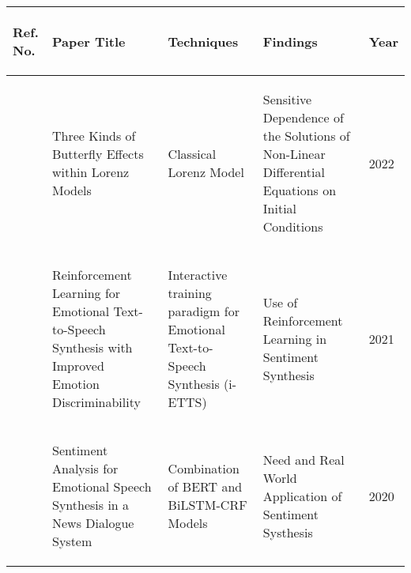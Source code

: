 \begin{tabularx}{\columnwidth}{|X|X|X|X|X|}
	\hline
	\begin{center}\textbf{Ref. No.}\end{center} & \begin{center}\textbf{Paper Title}\end{center} & \begin{center}\textbf{Techniques}\end{center} & \begin{center}\textbf{Findings}\end{center} & \begin{center}\textbf{Year}\end{center}\\
	\hline
	\begin{center}\cite{encyclopedia2030084}\end{center} & \begin{center}Three Kinds of Butterfly Effects within Lorenz Models\end{center} & \begin{center}Classical Lorenz Model\end{center} & \begin{center}Sensitive Dependence of the Solutions of Non-Linear Differential Equations on Initial Conditions\end{center} & \begin{center}2022\end{center}\\
	\hline
	\begin{center}\cite{liu21p_interspeech}\end{center} & \begin{center}Reinforcement Learning for Emotional Text-to-Speech Synthesis with Improved Emotion Discriminability\end{center} & \begin{center}Interactive training paradigm for Emotional Text-to-Speech Synthesis (i-ETTS)\end{center} & \begin{center}Use of Reinforcement Learning in Sentiment Synthesis\end{center} & \begin{center}2021\end{center}\\
	\hline
	\begin{center}\cite{takatsu-etal-2020-sentiment}\end{center} & \begin{center}Sentiment Analysis for Emotional Speech Synthesis in a News Dialogue System\end{center} & \begin{center}Combination of BERT and BiLSTM-CRF Models\end{center} & \begin{center}Need and Real World Application of Sentiment Systhesis\end{center} & \begin{center}2020\end{center}\\
	\hline
\end{tabularx}


